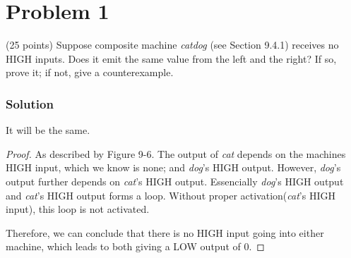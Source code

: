 
\section*{Problem 1}
(25 points) Suppose composite machine \textit{catdog} (see Section 9.4.1) receives no HIGH inputs. 
Does it emit the same value from the left and the right? 
If so, prove it; if not, give a counterexample.

\subsubsection*{Solution}

It will be the same.

\begin{proof}

    As described by Figure 9-6. 
    The output of \textit{cat} depends on the machines HIGH input, which we know is none; and \textit{dog}'s HIGH output.
    However, \textit{dog}'s output further depends on \textit{cat}'s HIGH output.
    Essencially \textit{dog}'s HIGH output and \textit{cat}'s HIGH output forms a loop.
    Without proper activation(\textit{cat}'s HIGH input), this loop is not activated.

    Therefore, we can conclude that there is no HIGH input going into either machine, which leads to both giving a LOW output of 0.

\end{proof}